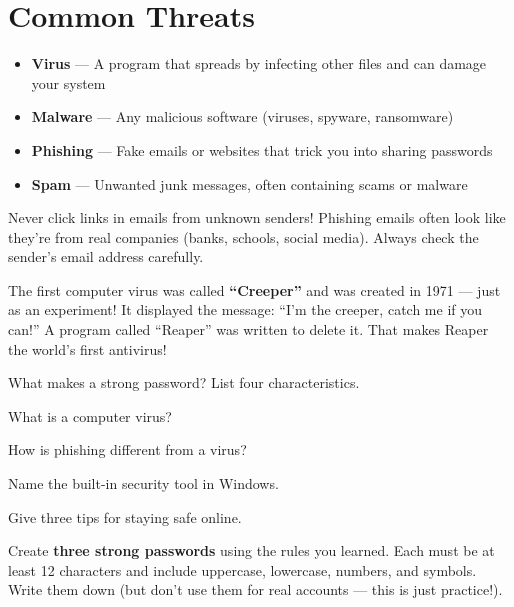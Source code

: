 \section{Common Threats}
\label{sec:threats}

\begin{itemize}[leftmargin=*, label={\textcolor{WarnRed}{\faExclamationTriangle}}, itemsep=4pt]
  \item \textbf{Virus} --- A program that spreads by infecting other files and can damage your system
  \item \textbf{Malware} --- Any malicious software (viruses, spyware, ransomware)
  \item \textbf{Phishing} --- Fake emails or websites that trick you into sharing passwords
  \item \textbf{Spam} --- Unwanted junk messages, often containing scams or malware
\end{itemize}

\begin{warnbox}
Never click links in emails from unknown senders! Phishing emails often look like they're from real companies (banks, schools, social media). Always check the sender's email address carefully.
\end{warnbox}


\begin{funfact}
The first computer virus was called \textbf{``Creeper''} and was created in 1971 --- just as an experiment! It displayed the message: ``I'm the creeper, catch me if you can!'' A program called ``Reaper'' was written to delete it. That makes Reaper the world's first antivirus!
\end{funfact}

\begin{reviewqs}
  \item What makes a strong password? List four characteristics.
  \item What is a computer virus?
  \item How is phishing different from a virus?
  \item Name the built-in security tool in Windows.
  \item Give three tips for staying safe online.
\end{reviewqs}

\begin{challenge}
Create \textbf{three strong passwords} using the rules you learned. Each must be at least 12 characters and include uppercase, lowercase, numbers, and symbols. Write them down (but don't use them for real accounts --- this is just practice!).
\end{challenge}
